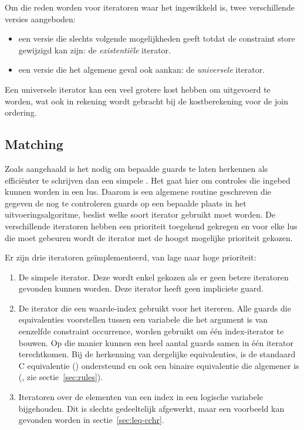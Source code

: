 {Om die reden worden voor iteratoren waar het ingewikkeld is, twee verschillende versies aangeboden: \begin{itemize}
\item een versie die slechts volgende mogelijkheden geeft totdat de constraint store gewijzigd kan zijn: de {\em existenti\"ele} iterator.
\item een versie die het algemene geval ook aankan: de {\em universele} iterator.
\end{itemize}

Een universele iterator kan een veel grotere kost hebben om uitgevoerd te worden, wat ook in rekening wordt gebracht bij de kostberekening voor de join ordering.

\subsection{Matching} \label{sec:matching}

Zoals aangehaald is het nodig om bepaalde guards te laten herkennen als effici\"enter te schrijven dan een simpele . Het gaat hier om controles die ingebed kunnen worden in een lus. Daarom is een algemene routine geschreven die gegeven de nog te controleren guards op een bepaalde plaats in het uitvoeringsalgoritme, beslist welke soort iterator gebruikt moet worden. De verschillende iteratoren hebben een prioriteit toegekend gekregen en voor elke lus die moet gebeuren wordt de iterator met de hoogst mogelijke prioriteit gekozen.

Er zijn drie iteratoren ge\"implementeerd, van lage naar hoge prioriteit: \begin{enumerate}
\item De simpele  iterator. Deze wordt enkel gekozen als er geen betere iteratoren gevonden kunnen worden. Deze iterator heeft geen impliciete guard.
\item De  iterator die een waarde-index gebruikt voor het itereren. Alle guards die equivalenties voorstellen tussen een variabele die het argument is van eenzelfde constraint occurrence, worden gebruikt om \'e\'en index-iterator te bouwen. Op die manier kunnen een heel aantal guards samen in \'e\'en iterator terechtkomen. Bij de herkenning van dergelijke equivalenties, is de standaard C equivalentie (\code{==}) ondersteund en ook een binaire equivalentie die algemener is (, zie sectie~\ref{sec:rules}).
\item Iteratoren over de elementen van een index in een logische variabele bijgehouden. Dit is slechts gedeeltelijk afgewerkt, maar een voorbeeld kan gevonden worden in sectie~\ref{sec:leq-cchr}.
\end{enumerate}

}
